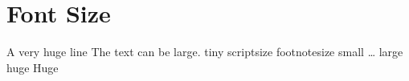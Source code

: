 \documentclass{article}
\begin{document}
    \section{Font Size}
        {
            \fontsize{24.88pt}{36pt} \selectfont 
            A very huge\newline
            line
        }\newline
        The text can be {\Large large}. \newline
        {\tiny tiny}\newline
        {\scriptsize scriptsize}\newline
        {\footnotesize footnotesize}\newline
        {\small small}\newline
        \ldots\newline
        {\LARGE large}\newline
        {\huge huge}\newline
        {\Huge Huge}\newline
         
\end{document}
